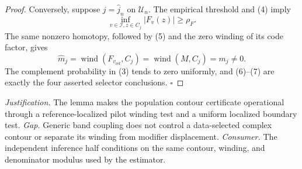\documentclass{article}
\begin{document}
\begin{proof}
Conversely, suppose \(j=\widehat j_n\) on \(\mathcal U_n\).  The empirical threshold and (4) imply
\[
 \inf_{v\in\mathcal I,z\in C_j}|F_v(z)|\ge\rho_F. \tag{6}
\]
The same nonzero homotopy, followed by (5) and the zero winding of its code factor, gives
\[
 \widehat m_j
 =\operatorname{wind}(F_{v_{\mathrm{ref}}},C_j)
 =\operatorname{wind}(M,C_j)=m_j\ne0. \tag{7}
\]
The complement probability in (3) tends to zero uniformly, and (6)--(7) are exactly the four asserted selector conclusions. \(\square\)
\end{proof}
\par\smallskip\noindent \textit{Justification.} The lemma makes the population contour certificate operational through a reference-localized pilot winding test and a uniform localized boundary test. \textit{Gap.} Generic band coupling does not control a data-selected complex contour or separate its winding from modifier displacement. \textit{Consumer.} The independent inference half conditions on the same contour, winding, and denominator modulus used by the estimator.
\end{document}
